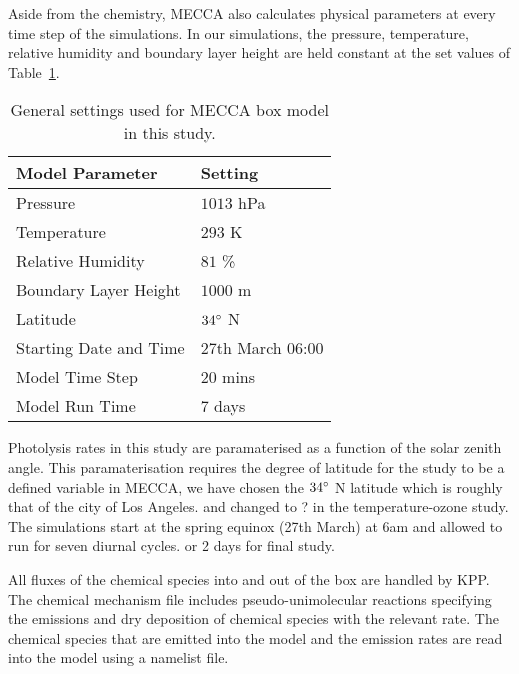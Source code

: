 Aside from the chemistry, MECCA also calculates physical parameters at every time step of the simulations.
In our simulations, the pressure, temperature, relative humidity and boundary layer height are held constant at the set values of Table~\ref{t:model_setup}.
\begin{table}[t]%
    \begin{center}%
        \caption{General settings used for MECCA box model in this study.}%
        \begin{tabular}{ll}%
            \hline \hline
            \textbf{Model Parameter} & \textbf{Setting} \\
            \hline \hline
            Pressure & $1013$ hPa \\
            Temperature & $293$ K \\
            Relative Humidity & $81$ \% \\
            Boundary Layer Height & $1000$ m \\
            Latitude & $34^{\circ}$ N \\
            Starting Date and Time & 27th March 06:00 \\
            Model Time Step & $20$ mins \\
            Model Run Time & $7$ days \\
            \hline \hline
        \end{tabular}%
        \label{t:model_setup}%
    \end{center}%
\end{table}%

Photolysis rates in this study are paramaterised as a function of the solar zenith angle.
This paramaterisation requires the degree of latitude for the study to be a defined variable in MECCA, we have chosen the $34^{\circ}$ N latitude which is roughly that of the city of Los Angeles.
and changed to ? in the temperature-ozone study.
The simulations start at the spring equinox (27th March) at 6am and allowed to run for seven diurnal cycles.
or 2 days for final study.

All fluxes of the chemical species into and out of the box are handled by KPP.
The chemical mechanism file includes pseudo-unimolecular reactions specifying the emissions and dry deposition of chemical species with the relevant rate.
The chemical species that are emitted into the model and the emission rates are read into the model using a namelist file.

